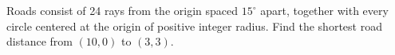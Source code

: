 Roads consist of 24 rays from the origin spaced $ 15^\circ $ apart, together with every circle centered at the origin of positive integer radius. Find the shortest road distance from $(10,0)$ to $(3,3)$.
